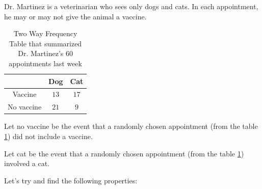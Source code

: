 
Dr. Martinez is a veterinarian who sees only dogs and cats.
In each appointment, he may or may not give the animal a vaccine.

\begin{center}
  \begin{table}[htpb]
    \centering
    \caption{Two Way Frequency Table that summarized Dr. Martinez's $60$ 
             appointments last week}
    \label{tab:two_way_frequency_table_with_a_random_sample_of_60_items_sold_that_night}
  
    \begin{tabular}{|c|c|c|}
      \hline
      & Dog & Cat \\ 
      \hline
      Vaccine & $13$ & $17$ \\
      \hline
      No vaccine & $21$ & $9$ \\
      \hline
    \end{tabular}
  \end{table}
\end{center}

Let no vaccine be the event that a randomly chosen appointment (from the table
\ref{tab:two_way_frequency_table_with_a_random_sample_of_60_items_sold_that_night})
did not include a vaccine.

Let cat be the event that a randomly chosen appointment (from the table
\ref{tab:two_way_frequency_table_with_a_random_sample_of_60_items_sold_that_night})
involved a cat.


Let's try and find the following properties:

